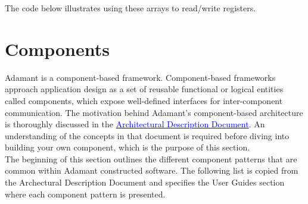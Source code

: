 The code below illustrates using these arrays to read/write registers.


\newpage
\section{Components} \label{Components}

Adamant is a component-based framework. Component-based frameworks approach application design as a set of reusable functional or logical entities called components, which expose well-defined interfaces for inter-component communication. The motivation behind Adamant's component-based architecture is thoroughly discussed in the \href{https://github.com/lasp/adamant/blob/main/doc/architecture_description_document/architecture_description_document.pdf}{\textcolor{blue}{Architectural Description Document}}. An understanding of the concepts in that document is required before diving into building your own component, which is the purpose of this section. \\

The beginning of this section outlines the different component patterns that are common within Adamant constructed software. The following list is copied from the Archectural Description Document and specifies the User Guides section where each component pattern is presented.

